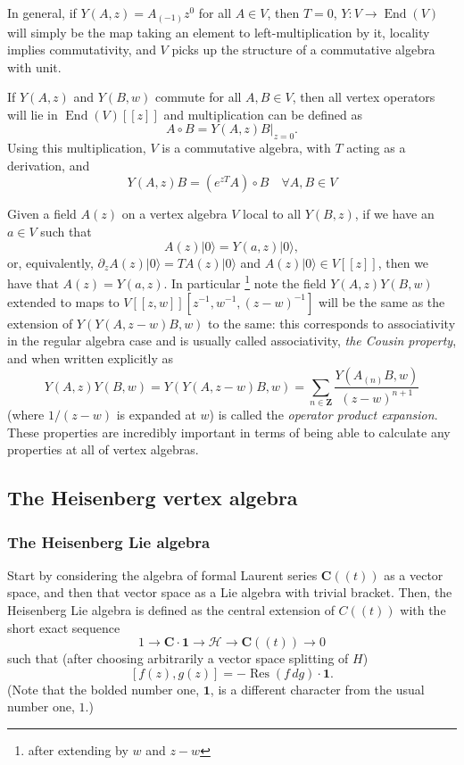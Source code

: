 \documentclass{article}
\newcommand{\CC}{\mathbold{C}}
\newcommand{\ZZ}{\mathbold{Z}}
\newcommand{\vac}{|0\rangle}
\newcommand{\Hh}{\mathcal{H}}
\newcommand{\one}{\mathbold{1}}
\DeclareMathOperator{\Res}{Res}
\DeclareMathOperator{\End}{End}
\begin{document}
In general, if $Y(A,z)=A_{(-1)}z^0$ for all $A \in V$, then $T=0$, $Y: V \rightarrow \End(V)$ will simply be the map taking an element to left-multiplication by it, locality implies commutativity, and $V$ picks up the structure of a commutative algebra with unit.

If $Y(A,z)$ and $Y(B,w)$ commute for all $A,B \in V$, then all vertex operators will lie in $\End(V)[[z]]$ and multiplication can be defined as
\[A \circ B = Y(A,z)B|_{z=0}. \]
Using this multiplication, $V$ is a commutative algebra, with $T$ acting as a derivation, and
\[Y(A,z)B=(e^{zT}A) \circ B \quad \forall A,B \in V \]

Given a field $A(z)$ on a vertex algebra $V$ local to all $Y(B,z)$, if we have an $a \in V$ such that
\[A(z)\vac=Y(a,z) \vac, \]
or, equivalently, $\partial_z A(z) \vac=TA(z)\vac$ and $A(z)\vac \in V[[z]]$, then we have that $A(z)=Y(a,z)$.  In particular \footnote{after extending by $w$ and $z-w$} note the field $Y(A,z)Y(B,w)$ extended to maps to $V[[z,w]][z^{-1},w^{-1},(z-w)^{-1}]$ will be the same as the extension of $Y(Y(A,z-w)B,w)$ to the same: this corresponds to associativity in the regular algebra case and is usually called associativity, \textit{the Cousin property}, and when written explicitly as
\[Y(A,z)Y(B,w)=Y(Y(A,z-w)B,w)=\sum_{n \in \ZZ}\frac{Y(A_{(n)}B,w)}{(z-w)^{n+1}} \]
(where $1/(z-w)$ is expanded at $w$) is called the \textit{operator product expansion}.  These properties are incredibly important in terms of being able to calculate any properties at all of vertex algebras.
\subsection{The Heisenberg vertex algebra}

\subsubsection{The Heisenberg Lie algebra}


Start by considering the algebra of formal Laurent series $\CC((t))$ as a vector space, and then that vector space as a Lie algebra with trivial bracket.  Then, the Heisenberg Lie algebra is defined as the central extension of $C((t))$ with the short exact sequence
\[1 \rightarrow \CC \cdot \one \rightarrow \Hh \rightarrow \CC((t)) \rightarrow 0 \]
such that (after choosing arbitrarily a vector space splitting of $H$)
\[[f(z),g(z)]=-\Res(f\,dg) \cdot \one. \]
(Note that the bolded number one, $\one$, is a different character from the usual number one, $1$.)  
\end{document}
